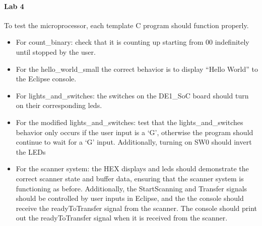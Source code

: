 \documentclass{article}
\begin{document}
    \paragraph{Lab 4} To test the microprocessor, each template C program should function properly.
    \begin{itemize}
      \item For count\_binary: check that it is counting up starting from 00 indefinitely until stopped by the user.
      \item For the hello\_world\_small the correct behavior is to display “Hello World” to the Eclipse console.
      \item For lights\_and\_switches: the switches on the DE1\_SoC board should turn on their corresponding leds.
      \item For the modified lights\_and\_switches: test that the lights\_and\_switches behavior only occurs if the user input is a ‘G’, otherwise the program should continue to wait for a ‘G’ input. Additionally, turning on SW0 should invert the LEDs
      \item For the scanner system: the HEX displays and leds should demonstrate the correct scanner state and buffer data, ensuring that the scanner system is functioning as before. Additionally, the StartScanning and Transfer signals should be controlled by user inputs in Eclipse, and the the console should receive the readyToTransfer signal from the scanner. The console should print out the readyToTransfer signal when it is received from the scanner.
    \end{itemize}
\end{document}
